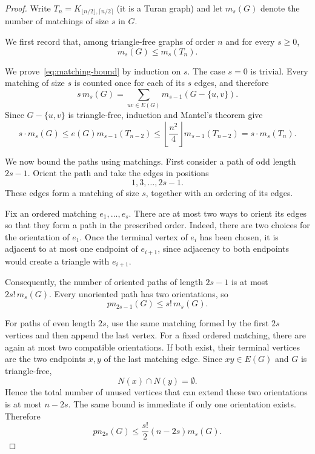 \documentclass[a4paper,11pt]{article}
\newcommand{\pn}{pn}
\begin{document}
\begin{proof}
Write $T_n=K_{\lfloor n/2\rfloor,\lceil n/2\rceil}$ (it is a Turan graph)
and let $m_s(G)$ denote the number of matchings of size $s$ in $G$.

We first record that, among triangle-free graphs of order $n$ and for every $s\geq0$,
\begin{equation}\label{eq:matching-bound}
        m_s(G)\le m_s(T_n).
\end{equation}

We prove~\eqref{eq:matching-bound} by induction on $s$. The case $s=0$ is trivial. Every
matching of size $s$ is counted once for each of its $s$ edges, and
therefore
\[
 s\,m_s(G)
   =\sum_{uv\in E(G)}m_{s-1}(G-\{u,v\}).
\]
Since $G-\{u,v\}$ is triangle-free, induction and Mantel's theorem give
\[
 s \cdot m_s(G)
 \leq e(G)m_{s-1}(T_{n-2})
 \leq
 \left\lfloor\frac{n^2}{4}\right\rfloor
 m_{s-1}(T_{n-2})= s \cdot m_s(T_n).
\]


We now bound the paths using matchings. First consider a path of odd
length $2s-1$. Orient the path and take the edges in positions
\[
        1,3,\ldots,2s-1.
\]
These edges form a matching of size $s$, together with an ordering of
its edges.

Fix an ordered matching $e_1,\ldots,e_s$. There are at most two ways
to orient its edges so that they form a path in the prescribed order.
Indeed, there are two choices for the orientation of $e_1$. Once the
terminal vertex of $e_i$ has been chosen, it is adjacent to at most
one endpoint of $e_{i+1}$, since adjacency to both endpoints would
create a triangle with $e_{i+1}$.

Consequently, the number of oriented paths of length $2s-1$ is at most $2s!\,m_s(G).$
Every unoriented path has two orientations, so
\begin{equation}\label{eq:odd-path}
        \pn_{2s-1}(G)\leq s!\,m_s(G).
\end{equation}

For paths of even length $2s$, use the same matching formed by the
first $2s$ vertices and then append the last vertex. For a fixed
ordered matching, there are again at most two compatible orientations.
If both exist, their terminal vertices are the two endpoints $x,y$ of
the last matching edge. Since $xy\in E(G)$ and $G$ is triangle-free,
\[
        N(x)\cap N(y)=\emptyset.
\]
Hence the total number of unused vertices that can extend these two
orientations is at most $n-2s$. The same bound is immediate if only
one orientation exists. Therefore
\begin{equation}\label{eq:even-path}
        \pn_{2s}(G)
        \leq \frac{s!}{2}(n-2s)m_s(G).
\end{equation}


\end{proof}
\end{document}
